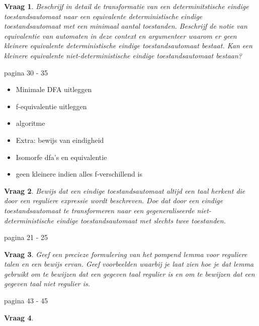 \documentclass[10pt,a4paper]{article}
\newtheorem{qtext}{Vraag}
\newenvironment{question}{\newpage\begin{qbox}\begin{qtext}}{\end{qtext}\end{qbox}}
\begin{document}
\begin{question}
	Beschrijf in detail de transformatie van een determinitstische eindige toestandsautomaat naar een equivalente deterministische eindige toestandsautomaat met een minimaal aantal toestanden. Beschrijf de notie van equivalentie van automaten in deze context en argumenteer waarom er geen kleinere equivalente deterministische eindige toestandsautomaat bestaat. Kan een kleinere equivalente niet-deterministische eindige toestandsautomaat bestaan?
\end{question}

pagina 30 - 35
\begin{itemize}
	\item Minimale DFA uitleggen
	\item f-equivalentie uitleggen
	\item algoritme
	\item Extra: bewijs van eindigheid
	\item Isomorfe dfa's en equivalentie
	\item geen kleinere indien alles f-verschillend is
\end{itemize}

\newpage



\newpage

\begin{question}
	Bewijs dat een eindige toestandsautomaat altijd een taal herkent die door een reguliere expressie wordt beschreven. Doe dat door een eindige toestandsautomaat te transformeren naar een gegeneraliseerde niet-deterministische eindige toestandsautomaat met slechts twee toestanden.
\end{question}

pagina 21 - 25

\newpage

\begin{question}
	Geef een precieze formulering van het pompend lemma voor reguliere talen en een bewijs ervan. Geef voorbeelden waarbij je laat zien hoe je dat lemma gebruikt om te bewijzen dat een gegeven taal regulier is en om te bewijzen dat een gegeven taal niet regulier is.
\end{question}

pagina 43 - 45

\newpage

\begin{question}
	
\end{question}
\end{document}
